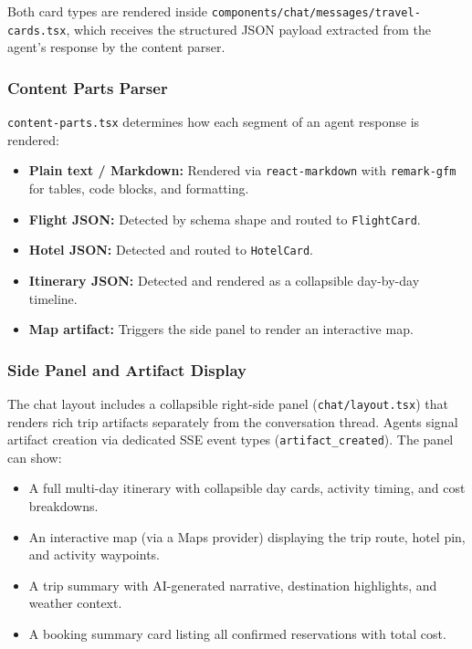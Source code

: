 \documentclass[12pt, a4paper]{article}
\begin{document}
Both card types are rendered inside \texttt{components/chat/messages/travel-cards.tsx}, which receives the structured JSON payload extracted from the agent's response by the content parser.

\subsubsection{Content Parts Parser}

\texttt{content-parts.tsx} determines how each segment of an agent response is rendered:

\begin{itemize}[leftmargin=1.5cm, itemsep=0.3em]
  \item \textbf{Plain text / Markdown:} Rendered via \texttt{react-markdown} with \texttt{remark-gfm} for tables, code blocks, and formatting.
  \item \textbf{Flight JSON:} Detected by schema shape and routed to \texttt{FlightCard}.
  \item \textbf{Hotel JSON:} Detected and routed to \texttt{HotelCard}.
  \item \textbf{Itinerary JSON:} Detected and rendered as a collapsible day-by-day timeline.
  \item \textbf{Map artifact:} Triggers the side panel to render an interactive map.
\end{itemize}

\subsubsection{Side Panel and Artifact Display}

The chat layout includes a collapsible right-side panel (\texttt{chat/layout.tsx}) that renders rich trip artifacts separately from the conversation thread. Agents signal artifact creation via dedicated SSE event types (\texttt{artifact\_created}). The panel can show:

\begin{itemize}[leftmargin=1.5cm, itemsep=0.3em]
  \item A full multi-day itinerary with collapsible day cards, activity timing, and cost breakdowns.
  \item An interactive map (via a Maps provider) displaying the trip route, hotel pin, and activity waypoints.
  \item A trip summary with AI-generated narrative, destination highlights, and weather context.
  \item A booking summary card listing all confirmed reservations with total cost.
\end{itemize}
\end{document}
